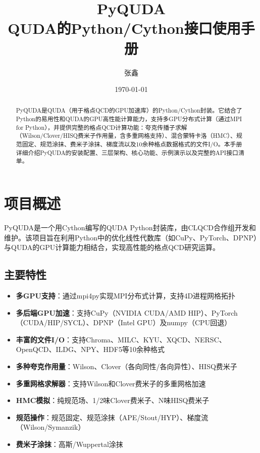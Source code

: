 \documentclass[12pt,a4paper]{ctexart}
\title{\heiti PyQUDA \\[3pt] \large QUDA的Python/Cython接口使用手册}
\author{张鑫}
\date{\today}
\begin{document}
\maketitle

\begin{abstract}
\noindent
PyQUDA是QUDA（用于格点QCD的GPU加速库）的Python/Cython封装。它结合了Python的易用性和QUDA的GPU高性能计算能力，支持多GPU分布式计算（通过MPI for Python），并提供完整的格点QCD计算功能：夸克传播子求解（Wilson/Clover/HISQ费米子作用量，含多重网格支持）、混合蒙特卡洛（HMC）、规范固定、规范涂抹、费米子涂抹、梯度流以及10余种格点数据格式的文件I/O。本手册详细介绍PyQUDA的安装配置、三层架构、核心功能、示例演示以及完整的API接口清单。
\end{abstract}

\tableofcontents
\newpage

\section{项目概述}

PyQUDA是一个用Cython编写的QUDA Python封装库，由CLQCD合作组开发和维护。该项目旨在利用Python中的优化线性代数库（如CuPy、PyTorch、DPNP）与QUDA的GPU计算能力相结合，实现高性能的格点QCD研究运算。

\subsection{主要特性}
\begin{itemize}[leftmargin=*]
    \item \textbf{多GPU支持}：通过mpi4py实现MPI分布式计算，支持4D进程网格拓扑
    \item \textbf{多后端GPU加速}：支持CuPy（NVIDIA CUDA/AMD HIP）、PyTorch（CUDA/HIP/SYCL）、DPNP（Intel GPU）及numpy（CPU回退）
    \item \textbf{丰富的文件I/O}：支持Chroma、MILC、KYU、XQCD、NERSC、OpenQCD、ILDG、NPY、HDF5等10余种格式
    \item \textbf{多种夸克作用量}：Wilson、Clover（各向同性/各向异性）、HISQ费米子
    \item \textbf{多重网格求解器}：支持Wilson和Clover费米子的多重网格加速
    \item \textbf{HMC模拟}：纯规范场、1/2味Clover费米子、N味HISQ费米子
    \item \textbf{规范操作}：规范固定、规范涂抹（APE/Stout/HYP）、梯度流（Wilson/Symanzik）
    \item \textbf{费米子涂抹}：高斯/Wuppertal涂抹
\end{itemize}
\end{document}

